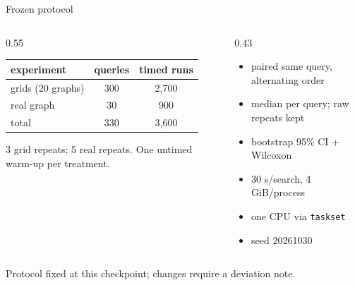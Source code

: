 \documentclass[aspectratio=169,10pt]{beamer}
\begin{document}
\begin{frame}{Frozen protocol}
  \small
  \begin{columns}[T,onlytextwidth]
    \begin{column}{0.55\textwidth}
      \begin{tabular}{lcc}
        \toprule
        experiment & queries & timed runs\\
        \midrule
        grids (20 graphs) & 300 & 2,700\\
        real graph & 30 & 900\\
        \midrule
        total & 330 & 3,600\\
        \bottomrule
      \end{tabular}
      \vspace{0.7em}

      3 grid repeats; 5 real repeats.  One untimed warm-up per treatment.
    \end{column}
    \begin{column}{0.43\textwidth}
      \begin{itemize}
        \item paired same query, alternating order
        \item median per query; raw repeats kept
        \item bootstrap 95\% CI + Wilcoxon
        \item 30 s/search, 4 GiB/process
        \item one CPU via \texttt{taskset}
        \item seed 20261030
      \end{itemize}
    \end{column}
  \end{columns}
  \vspace{0.5em}
  \centering
  Protocol fixed at this checkpoint; changes require a deviation note.
\end{frame}
\end{document}
